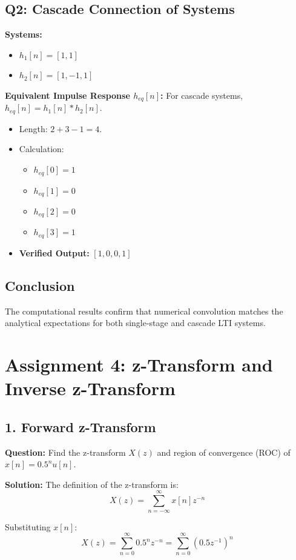 \documentclass[11pt, a4paper]{article}
\begin{document}
\subsection{Q2: Cascade Connection of Systems}
\textbf{Systems:}
\begin{itemize}
    \item $h_1[n] = [1, 1]$
    \item $h_2[n] = [1, -1, 1]$
\end{itemize}

\textbf{Equivalent Impulse Response $h_{eq}[n]$:}
For cascade systems, $h_{eq}[n] = h_1[n] * h_2[n]$.
\begin{itemize}
    \item Length: $2 + 3 - 1 = 4$.
    \item Calculation:
    \begin{itemize}
        \item $h_{eq}[0] = 1$
        \item $h_{eq}[1] = 0$
        \item $h_{eq}[2] = 0$
        \item $h_{eq}[3] = 1$
    \end{itemize}
    \item \textbf{Verified Output:} $[1, 0, 0, 1]$
\end{itemize}

\subsection{Conclusion}
The computational results confirm that numerical convolution matches the analytical expectations for both single-stage and cascade LTI systems.

\newpage
\section{Assignment 4: z-Transform and Inverse z-Transform}

\subsection{1. Forward z-Transform}
\textbf{Question:} Find the z-transform $X(z)$ and region of convergence (ROC) of $x[n] = 0.5^n u[n]$.

\textbf{Solution:}
The definition of the z-transform is:
$$X(z) = \sum_{n=-\infty}^{\infty} x[n] z^{-n}$$

Substituting $x[n]$:
$$X(z) = \sum_{n=0}^{\infty} 0.5^n z^{-n} = \sum_{n=0}^{\infty} (0.5 z^{-1})^n$$
\end{document}
